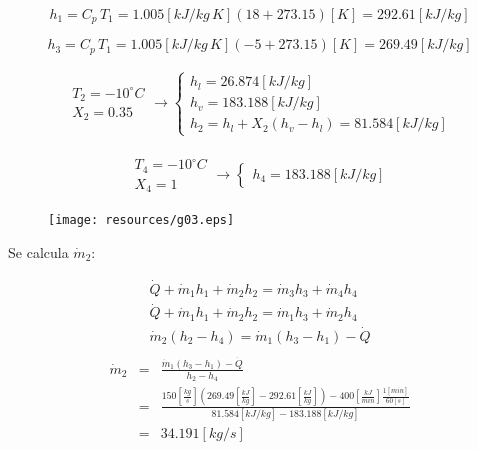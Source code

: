 \documentclass[letter,10pt]{article}
\begin{document}
\begin{enumerate}
\begin{equation*}
    h_1 = C_p\,T_1 = 1.005[kJ/kg\,K] (18 + 273.15)[K] = 292.61[kJ/kg]
\end{equation*}

\begin{equation*}
    h_3 = C_p\,T_1 = 1.005[kJ/kg\,K] (-5 + 273.15)[K] = 269.49[kJ/kg]
\end{equation*}

\begin{eqnarray*}
    \begin{array}{c}
        T_2 = -10^\circ C \\
        X_2 = 0.35
    \end{array}
    \rightarrow
    \begin{cases}
        h_l = 26.874[kJ/kg] \\
        h_v = 183.188[kJ/kg] \\
        h_2 = h_l + X_2 (h_v - h_l) = 81.584[kJ/kg]
    \end{cases}
\end{eqnarray*}

\begin{eqnarray*}
    \begin{array}{c}
        T_4 = -10^\circ C \\
        X_4 = 1
    \end{array}
    \rightarrow
    \begin{cases}
        h_4 = 183.188[kJ/kg]
    \end{cases}
\end{eqnarray*}

\begin{figure}[H]
\centering
\texttt{[image: resources/g03.eps]}
\end{figure}

Se calcula $\dot{m}_2$:

\begin{eqnarray*}
    \dot{Q} + \dot{m}_1 h_1 + \dot{m}_2 h_2 = \dot{m}_3 h_3 + \dot{m}_4 h_4 \\
    \dot{Q} + \dot{m}_1 h_1 + \dot{m}_2 h_2 = \dot{m}_1 h_3 + \dot{m}_2 h_4 \\
    \dot{m}_2 (h_2 - h_4) = \dot{m}_1 (h_3 - h_1) - \dot{Q} \\
\end{eqnarray*}
\begin{eqnarray*}
    \dot{m}_2 &=& \frac{\dot{m}_1 (h_3 - h_1) - \dot{Q}}{h_2 - h_4} \\
              &=& \frac{150 [\frac{kg}{s}]\left(269.49[\frac{kJ}{kg}]
              - 292.61[\frac{kJ}{kg}]\right)
              - 400[\frac{kJ}{min}]\frac{1[min]}{60[s]}}{81.584[kJ/kg]
              - 183.188[kJ/kg]} \\
              &=& 34.191[kg/s]
\end{eqnarray*}


\end{enumerate}
\end{document}
